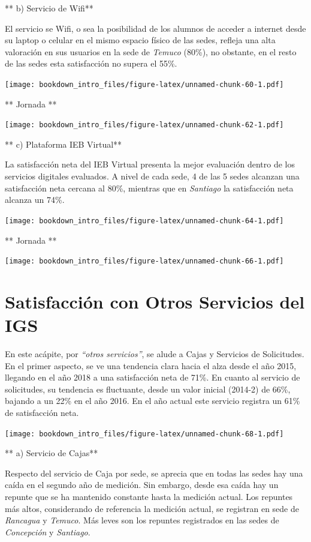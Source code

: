 \documentclass[]{book}
\begin{document}
** b) Servicio de Wifi**

El servicio se Wifi, o sea la posibilidad de los alumnos de acceder a
internet desde su laptop o celular en el mismo espacio físico de las
sedes, refleja una alta valoración en sus usuarios en la sede de
\emph{Temuco} (80\%), no obstante, en el resto de las sedes esta
satisfacción no supera el 55\%.

\texttt{[image: bookdown\_intro\_files/figure-latex/unnamed-chunk-60-1.pdf]}

** Jornada **

\texttt{[image: bookdown\_intro\_files/figure-latex/unnamed-chunk-62-1.pdf]}

** c) Plataforma IEB Virtual**

La satisfacción neta del IEB Virtual presenta la mejor evaluación dentro
de los servicios digitales evaluados. A nivel de cada sede, 4 de las 5
sedes alcanzan una satisfacción neta cercana al 80\%, mientras que en
\emph{Santiago} la satisfacción neta alcanza un 74\%.

\texttt{[image: bookdown\_intro\_files/figure-latex/unnamed-chunk-64-1.pdf]}

** Jornada **

\texttt{[image: bookdown\_intro\_files/figure-latex/unnamed-chunk-66-1.pdf]}

\section{Satisfacción con Otros Servicios del
IGS}\label{satisfaccion-con-otros-servicios-del-igs}

En este acápite, por \emph{``otros servicios''}, se alude a Cajas y
Servicios de Solicitudes. En el primer aspecto, se ve una tendencia
clara hacia el alza desde el año 2015, llegando en el año 2018 a una
satisfacción neta de 71\%. En cuanto al servicio de solicitudes, su
tendencia es fluctuante, desde un valor inicial (2014-2) de 66\%,
bajando a un 22\% en el año 2016. En el año actual este servicio
registra un 61\% de satisfacción neta.

\texttt{[image: bookdown\_intro\_files/figure-latex/unnamed-chunk-68-1.pdf]}

** a) Servicio de Cajas**

Respecto del servicio de Caja por sede, se aprecia que en todas las
sedes hay una caída en el segundo año de medición. Sin embargo, desde
esa caída hay un repunte que se ha mantenido constante hasta la medición
actual. Los repuntes más altos, considerando de referencia la medición
actual, se registran en sede de \emph{Rancagua} y \emph{Temuco}. Más
leves son los repuntes registrados en las sedes de \emph{Concepción} y
\emph{Santiago}.
\end{document}
